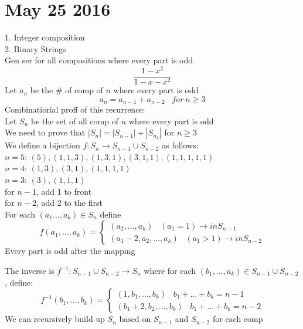 \documentclass{article}
\begin{document}
\section*{May 25 2016}
1. Integer composition\\
2. Binary Strings\\
Gen ser for all compositions where every part is odd $$\frac{1-x^2}{1-x-x^2}$$
Let $a_n$ be the \# of comp of $n$ where every part is odd $$a_n=a_{n-1}+a_{n-2}\hspace{10pt} for\ n\geq 3$$
Combinatiorial proff of this recurrence:\\
Let $S_n$ be the set of all comp of $n$ where every part is odd\\
We need to prove that $|S_n|=|S_{n-1}|+|S_{n_2}|$ for $n\geq 3$ \\
We define a bijection $f: S_n \rightarrow S_{n-1} \cup S_{n-2}$ as follows:\\
$n=5$: $(5),(1,1,3), (1,3,1), (3,1,1), (1,1,1,1,1)$\\
$n=4$: $(1,3), (3,1), (1,1,1,1)$\\
$n=3$: $(3), (1,1,1)$\\
for $n-1$, add 1 to front\\
for $n-2$, add 2 to the first\\
For each $(a_1\hdots, a_k) \in S_n$ define
$$
f(a_1,\hdots,a_k)=
\begin{cases}
(a_2, \hdots, a_k) \hspace{10pt} (a_1=1) \rightarrow in S_{n-1}\\
(a_1-2,a_2,\dots, a_k) \hspace{10pt} (a_1 > 1) \rightarrow in S_{n-2}
\end{cases}
$$ 
Every part is odd after the mapping

The inverse is $f^{-1}:S_{n-1}\cup S_{n-2} \rightarrow S_n$ where for each $(b_1,\hdots,a_k) \in S_{n-1} \cup S_{n-2}$, define:
$$
f^{-1}(b_1,\hdots,b_k)=
\begin{cases}
(1,b_1, \hdots, b_k) \hspace{10pt} b_1+\hdots+b_k = n-1\\
(b_1+2,b_2,\dots, b_k) \hspace{10pt} b_1+\hdots+b_k = n-2
\end{cases}
$$ 
We can recursively build up $S_n$ based on $S_{n-1}$ and $S_{n-2}$ for each comp
\end{document}
